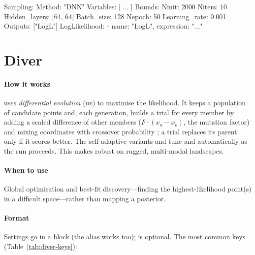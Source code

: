 \begin{yamlwin}
Sampling:
  Method: "DNN"
  Variables: [ ... ]
  Bounds:
    Ninit: 2000
    Niters: 10
    Hidden_layers: [64, 64]
    Batch_size: 128
    Nepoch: 50
    Learning_rate: 0.001
    Outputs: ["LogL"]
  LogLikelihood:
    - {name: "LogL", expression: "..."}
\end{yamlwin}

\section{Diver}
\label{sec:s-diver}

\paragraph{How it works}  uses \emph{differential evolution} (\textsc{de}) to
maximise the likelihood. It keeps a population of  candidate points and, each
generation, builds a trial for every member by adding a scaled difference of other members
($F\cdot(x_a - x_b)$, the  mutation factor) and mixing coordinates with crossover
probability ; a trial replaces its parent only if it scores better. The self-adaptive
variants  and  tune  and  automatically as the
run proceeds. This makes  robust on rugged, multi-modal landscapes.

\paragraph{When to use} Global optimisation and best-fit discovery---finding the highest-likelihood
point(s) in a difficult space---rather than mapping a posterior.

\paragraph{Format} Settings go in a  block (the alias  works too);
 is optional. The most common keys (Table~\ref{tab:diver-keys}):

